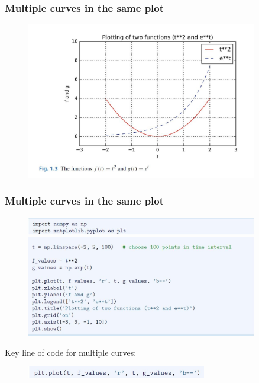 \documentclass[14pt]{beamer}
\begin{document}
\begin{frame}[fragile]
\frametitle{Multiple curves in the same plot}

\begin{figure}[ht]
	\centering
	\includegraphics[width=0.9\textwidth]{figures/LLp25b}
\end{figure}

\end{frame}


\begin{frame}[fragile]
\frametitle{Multiple curves in the same plot}

\vspace*{-3mm}
\begin{figure}[ht]
	\centering
	\includegraphics[width=0.9\textwidth]{figures/LLp24b}
	\includegraphics[width=0.9\textwidth]{figures/LLp25a}
\end{figure}
\vspace*{-3mm}
Key line of code for multiple curves:
\begin{figure}[ht]
	\centering
	\includegraphics[width=0.7\textwidth]{figures/LLp25c}
\end{figure}

\end{frame}
\end{document}
